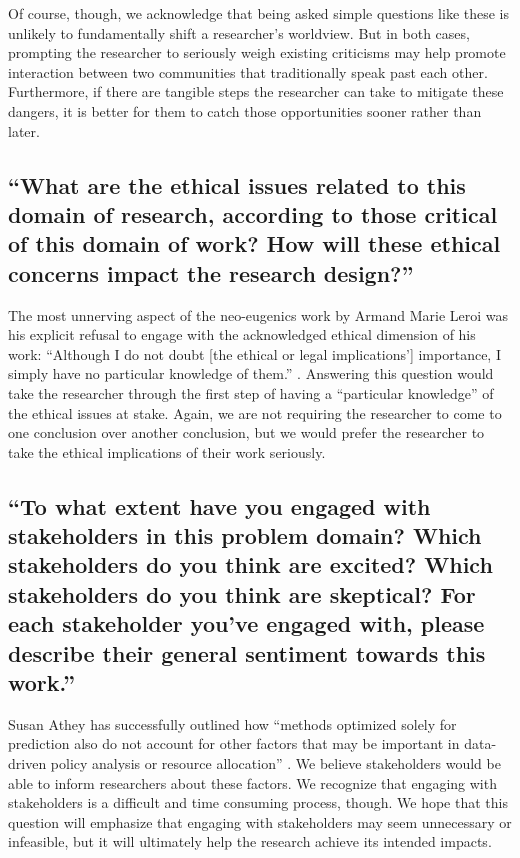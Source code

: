 \documentclass[12pt]{article}
\begin{document}
        Of course, though, we acknowledge that being asked simple questions like these is unlikely to fundamentally shift a researcher's worldview. But in both cases, prompting the researcher to seriously weigh existing criticisms may help promote interaction between two communities that traditionally speak past each other. Furthermore, if there are tangible steps the researcher can take to mitigate these dangers, it is better for them to catch those opportunities sooner rather than later. 

    \subsection{``What are the ethical issues related to this domain of research, according to those critical of this domain of work? How will these ethical concerns impact the research design?''}
    
        The most unnerving aspect of the neo-eugenics work by Armand Marie Leroi was his explicit refusal to engage with the acknowledged ethical dimension of his work: ``Although I do not doubt [the ethical or legal implications'] importance, I simply have no particular knowledge of them.'' \cite{neoeugenics}. Answering this question would take the researcher through the first step of having a ``particular knowledge'' of the ethical issues at stake. Again, we are not requiring the researcher to come to one conclusion over another conclusion, but we would prefer the researcher to take the ethical implications of their work seriously. 

    \subsection{``To what extent have you engaged with stakeholders in this problem domain? Which stakeholders do you think are excited? Which stakeholders do you think are skeptical? For each stakeholder you've engaged with, please describe their general sentiment towards this work.''}
    
        Susan Athey has successfully outlined how ``methods optimized solely for prediction also do not account for other factors that may be important in data-driven policy analysis or resource allocation'' \cite{beyondprediction}. We believe stakeholders would be able to inform researchers about these factors. We recognize that engaging with stakeholders is a difficult and time consuming process, though. We hope that this question will emphasize that engaging with stakeholders may seem unnecessary or infeasible, but it will ultimately help the research achieve its intended impacts. 
\end{document}
